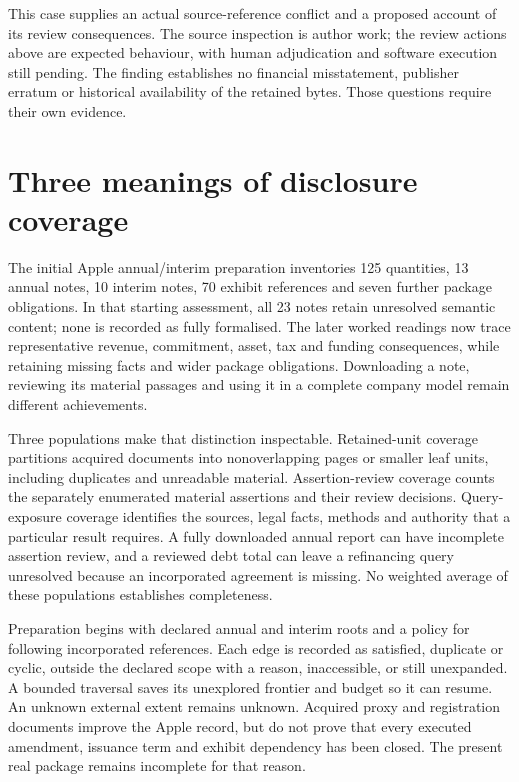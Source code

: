 This case supplies an actual source-reference conflict and a proposed account
of its review consequences. The source inspection is author work; the review
actions above are expected behaviour, with human adjudication and software
execution still pending. The finding establishes no financial misstatement,
publisher erratum or historical availability of the retained bytes. Those
questions require their own evidence.

\section{Three meanings of disclosure coverage}

The initial Apple annual/interim preparation inventories 125 quantities,
13 annual notes, 10 interim notes, 70 exhibit references and seven further
package obligations. In that starting assessment, all 23 notes retain
unresolved semantic content; none is recorded as fully formalised. The later
worked readings now trace representative revenue, commitment, asset, tax and
funding consequences, while retaining missing facts and wider package
obligations. Downloading a note, reviewing its material passages and using it
in a complete company model remain different achievements.

Three populations make that distinction inspectable. Retained-unit coverage
partitions acquired documents into nonoverlapping pages or smaller leaf units,
including duplicates and unreadable material. Assertion-review coverage counts
the separately enumerated material assertions and their review decisions.
Query-exposure coverage identifies the sources, legal facts, methods and
authority that a particular result requires. A fully downloaded annual report
can have incomplete assertion review, and a reviewed debt total can leave a
refinancing query unresolved because an incorporated agreement is missing.
No weighted average of these populations establishes completeness.

Preparation begins with declared annual and interim roots and a policy for
following incorporated references. Each edge is recorded as satisfied,
duplicate or cyclic, outside the declared scope with a reason, inaccessible,
or still unexpanded. A bounded traversal saves its unexplored frontier and
budget so it can resume. An unknown external extent remains unknown. Acquired
proxy and registration documents improve the Apple record, but do not prove
that every executed amendment, issuance term and exhibit dependency has been
closed. The present real package remains incomplete for that reason.

